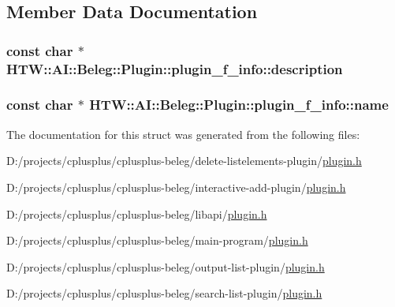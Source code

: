 \subsection{Member Data Documentation}
\hypertarget{struct_h_t_w_1_1_a_i_1_1_beleg_1_1_plugin_1_1plugin__f__info_a3518493d520eb0f08384be7d2189403b}{
\subsubsection[{description}]{\setlength{\rightskip}{0pt plus 5cm}const char $\ast$ H\-T\-W\-::\-A\-I\-::\-Beleg\-::\-Plugin\-::plugin\-\_\-f\-\_\-info\-::description}}\label{struct_h_t_w_1_1_a_i_1_1_beleg_1_1_plugin_1_1plugin__f__info_a3518493d520eb0f08384be7d2189403b}
\hypertarget{struct_h_t_w_1_1_a_i_1_1_beleg_1_1_plugin_1_1plugin__f__info_a60556440848508c263f94b80497bfab8}{
\subsubsection[{name}]{\setlength{\rightskip}{0pt plus 5cm}const char $\ast$ H\-T\-W\-::\-A\-I\-::\-Beleg\-::\-Plugin\-::plugin\-\_\-f\-\_\-info\-::name}}\label{struct_h_t_w_1_1_a_i_1_1_beleg_1_1_plugin_1_1plugin__f__info_a60556440848508c263f94b80497bfab8}


The documentation for this struct was generated from the following files\-:\begin{DoxyCompactItemize}
\item 
D\-:/projects/cplusplus/cplusplus-\/beleg/delete-\/listelements-\/plugin/\hyperlink{delete-listelements-plugin_2plugin_8h}{plugin.\-h}\item 
D\-:/projects/cplusplus/cplusplus-\/beleg/interactive-\/add-\/plugin/\hyperlink{interactive-add-plugin_2plugin_8h}{plugin.\-h}\item 
D\-:/projects/cplusplus/cplusplus-\/beleg/libapi/\hyperlink{libapi_2plugin_8h}{plugin.\-h}\item 
D\-:/projects/cplusplus/cplusplus-\/beleg/main-\/program/\hyperlink{main-program_2plugin_8h}{plugin.\-h}\item 
D\-:/projects/cplusplus/cplusplus-\/beleg/output-\/list-\/plugin/\hyperlink{output-list-plugin_2plugin_8h}{plugin.\-h}\item 
D\-:/projects/cplusplus/cplusplus-\/beleg/search-\/list-\/plugin/\hyperlink{search-list-plugin_2plugin_8h}{plugin.\-h}\end{DoxyCompactItemize}

